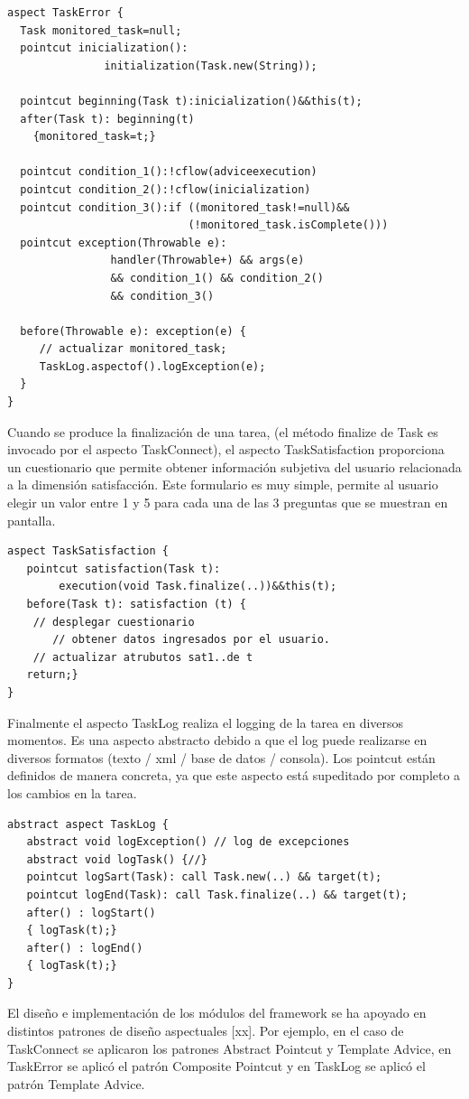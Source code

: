 \begin{verbatim}
aspect TaskError {
  Task monitored_task=null;
  pointcut inicialization():    
               initialization(Task.new(String));

  pointcut beginning(Task t):inicialization()&&this(t);
  after(Task t): beginning(t)
    {monitored_task=t;} 

  pointcut condition_1():!cflow(adviceexecution)
  pointcut condition_2():!cflow(inicialization) 
  pointcut condition_3():if ((monitored_task!=null)&&
                            (!monitored_task.isComplete()))
  pointcut exception(Throwable e): 
                handler(Throwable+) && args(e)
                && condition_1() && condition_2()
                && condition_3()

  before(Throwable e): exception(e) {
     // actualizar monitored_task;
     TaskLog.aspectof().logException(e);
  }
}

\end{verbatim}

Cuando se produce la finalización de una tarea, (el método finalize de Task es invocado por el aspecto TaskConnect), el aspecto TaskSatisfaction proporciona un cuestionario que permite obtener información subjetiva del usuario relacionada a la dimensión satisfacción. Este formulario es muy simple, permite al usuario elegir un valor entre 1 y 5 para cada una de las 3 preguntas que se muestran en pantalla. 

\begin{verbatim}
aspect TaskSatisfaction {
   pointcut satisfaction(Task t):
        execution(void Task.finalize(..))&&this(t);	
   before(Task t): satisfaction (t) {
	// desplegar cuestionario 
       // obtener datos ingresados por el usuario.
	// actualizar atrubutos sat1..de t
   return;}
}

\end{verbatim}

Finalmente el aspecto TaskLog  realiza el logging de la tarea en diversos momentos. Es una aspecto abstracto debido a que el log puede realizarse en diversos formatos (texto / xml / base de datos / consola). Los pointcut están definidos de manera concreta, ya que este aspecto está supeditado por completo a los cambios en la tarea.  

\begin{verbatim}
abstract aspect TaskLog {
   abstract void logException() // log de excepciones
   abstract void logTask() {//}
   pointcut logSart(Task): call Task.new(..) && target(t);
   pointcut logEnd(Task): call Task.finalize(..) && target(t);
   after() : logStart()
   { logTask(t);}
   after() : logEnd()
   { logTask(t);}
}

\end{verbatim}

El diseño e implementación de los módulos del framework se ha apoyado en distintos patrones de diseño aspectuales [xx]. Por ejemplo, en el caso de TaskConnect se aplicaron los patrones Abstract Pointcut y Template Advice, en TaskError se aplicó el patrón Composite Pointcut y en TaskLog se aplicó el patrón Template Advice.